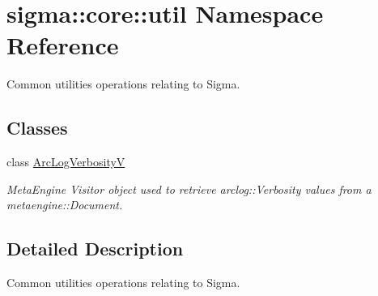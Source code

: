 \hypertarget{namespacesigma_1_1core_1_1util}{}\section{sigma\+:\+:core\+:\+:util Namespace Reference}
\label{namespacesigma_1_1core_1_1util}


Common utilities operations relating to Sigma.  


\subsection*{Classes}
\begin{DoxyCompactItemize}
\item 
class \hyperlink{classsigma_1_1core_1_1util_1_1_arc_log_verbosity_v}{Arc\+Log\+Verbosity\+V}
\begin{DoxyCompactList}\small\item\em Meta\+Engine Visitor object used to retrieve arclog\+::\+Verbosity values from a metaengine\+::\+Document. \end{DoxyCompactList}\end{DoxyCompactItemize}


\subsection{Detailed Description}
Common utilities operations relating to Sigma. 